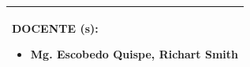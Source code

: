 \documentclass[10pt]{article}   %
\newcommand{\itemTeacher}{Mg. Escobedo Quispe, Richart Smith}
\begin{document}
\begin{table}[h!]
\begin{tabular}{|m{2.4cm}|m{2.1cm}|m{2.4cm}|m{2cm}|m{2.64cm}|m{2.42cm}|}
            \multicolumn{6}{|l|}{\begin{minipage}{8cm}
                \vspace{0.5em} %
                DOCENTE (s):
                \begin{itemize}
                    \setlength{\itemsep}{0pt}
                    \setlength{\parskip}{0pt}
                    \setlength{\parsep}{0pt}
                    \item \itemTeacher
                \end{itemize}
                \vspace{0em} %
            \end{minipage}}\\ \hline 	
        \end{tabular}
    \end{table}
    \normalsize
    
    
\end{document}
